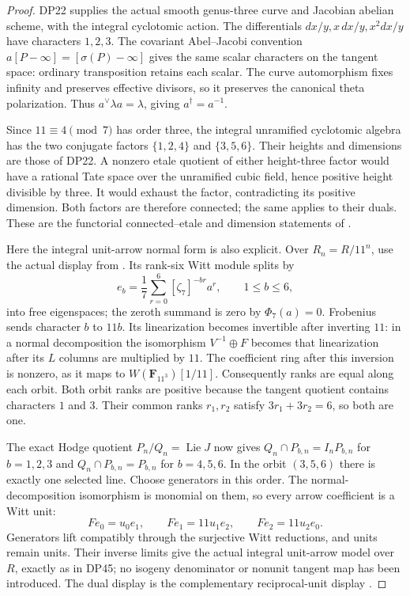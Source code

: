 \documentclass[11pt,a4paper]{article}
\theoremstyle{definition}\newtheorem{remark}[theorem]{Remark}
\begin{document}
\begin{proof}
DP22 supplies the actual smooth genus-three curve and Jacobian abelian scheme, with the integral cyclotomic action.
The differentials $dx/y,x\,dx/y,x^2dx/y$ have characters $1,2,3$.
The covariant Abel--Jacobi convention
$a[P-\infty]=[\sigma(P)-\infty]$ gives the same scalar characters on the tangent space: ordinary transposition retains each scalar.
The curve automorphism fixes infinity and preserves effective divisors, so it preserves the canonical theta polarization.
Thus $a^\vee\lambda a=\lambda$, giving $a^\dagger=a^{-1}$.

Since $11\equiv4\pmod7$ has order three, the integral unramified cyclotomic algebra has the two conjugate factors
$\{1,2,4\}$ and $\{3,5,6\}$.
Their heights and dimensions are those of DP22.
A nonzero etale quotient of either height-three factor would have a rational Tate space over the unramified cubic field, hence positive height divisible by three.
It would exhaust the factor, contradicting its positive dimension.
Both factors are therefore connected; the same applies to their duals.
These are the functorial connected--etale and dimension statements of
\cite[\S2.2, (4); \S2.3, Proposition 3]{Tate67}.

Here the integral unit-arrow normal form is also explicit.
Over $R_n=R/11^n$, use the actual display from
\cite[Theorems 5 and 9, pp.~131--132]{Zink}.
Its rank-six Witt module splits by
\[
 e_b=\frac17\sum_{r=0}^6[\zeta_7]^{-br}a^r,\qquad 1\le b\le6,
\]
into free eigenspaces; the zeroth summand is zero by $\Phi_7(a)=0$.
Frobenius sends character $b$ to $11b$.
Its linearization becomes invertible after inverting $11$:
in a normal decomposition the isomorphism $V^{-1}\oplus F$ becomes that linearization after its $L$ columns are multiplied by $11$.
The coefficient ring after this inversion is nonzero, as it maps to
$W(\mathbf F_{11^3})[1/11]$.
Consequently ranks are equal along each orbit.
Both orbit ranks are positive because the tangent quotient contains characters $1$ and $3$.
Their common ranks $r_1,r_2$ satisfy $3r_1+3r_2=6$, so both are one.

The exact Hodge quotient $P_n/Q_n=\operatorname{Lie}J$ now gives
$Q_n\cap P_{b,n}=I_nP_{b,n}$ for $b=1,2,3$ and
$Q_n\cap P_{b,n}=P_{b,n}$ for $b=4,5,6$.
In the orbit $(3,5,6)$ there is exactly one selected line.
Choose generators in this order.
The normal-decomposition isomorphism is monomial on them, so every arrow coefficient is a Witt unit:
\[
 Fe_0=u_0e_1,\qquad Fe_1=11u_1e_2,\qquad
 Fe_2=11u_2e_0 .
\]
Generators lift compatibly through the surjective Witt reductions, and units remain units.
Their inverse limits give the actual integral unit-arrow model over $R$, exactly as in DP45; no isogeny denominator or nonunit tangent map has been introduced.
The dual display is the complementary reciprocal-unit display
\cite[Definition 19 and (22), p.~143]{Zink}.


\end{proof}
\end{document}
